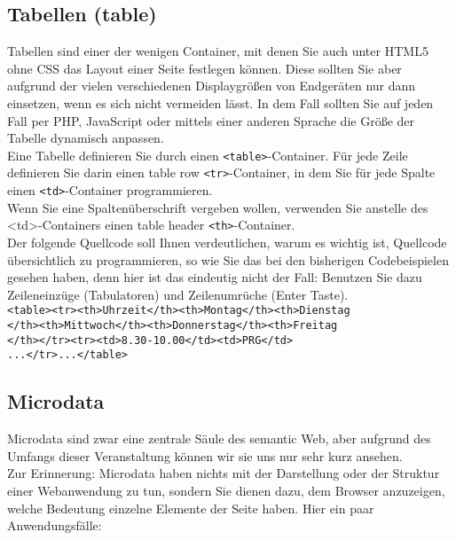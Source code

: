 \subsection{Tabellen (table)}

Tabellen sind einer der wenigen Container, mit denen Sie auch unter HTML5 ohne CSS das Layout einer Seite festlegen können. Diese sollten Sie aber aufgrund der vielen verschiedenen Displaygrößen von Endgeräten nur dann einsetzen, wenn es sich nicht vermeiden lässt. In dem Fall sollten Sie auf jeden Fall per PHP, JavaScript oder mittels einer anderen Sprache die Größe der Tabelle dynamisch anpassen.\\

Eine Tabelle definieren Sie durch einen \verb|<table>|-Container. Für jede Zeile definieren Sie darin einen table row \verb|<tr>|-Container, in dem Sie für jede Spalte einen \verb|<td>|-Container programmieren.\\

Wenn Sie eine Spaltenüberschrift vergeben wollen, verwenden Sie anstelle des <td>-Containers einen table header \verb|<th>|-Container.\\

Der folgende Quellcode soll Ihnen verdeutlichen, warum es wichtig ist, Quellcode übersichtlich zu programmieren, so wie Sie das bei den bisherigen Codebeispielen gesehen haben, denn hier ist das eindeutig nicht der Fall: Benutzen Sie dazu Zeileneinzüge (Tabulatoren) und Zeilenumrüche (Enter Taste).\\

\verb|<table><tr><th>Uhrzeit</th><th>Montag</th><th>Dienstag|\\\verb|</th><th>Mittwoch</th><th>Donnerstag</th><th>Freitag|\\\verb|</th></tr><tr><td>8.30-10.00</td><td>PRG</td>|\\\verb|...</tr>...</table>|

\subsection{Microdata}

Microdata sind zwar eine zentrale Säule des semantic Web, aber aufgrund des Umfangs dieser Veranstaltung können wir sie uns nur sehr kurz ansehen.\\

Zur Erinnerung: Microdata haben nichts mit der Darstellung oder der Struktur einer Webanwendung zu tun, sondern Sie dienen dazu, dem Browser anzuzeigen, welche Bedeutung einzelne Elemente der Seite haben. Hier ein paar Anwendungsfälle:\\

